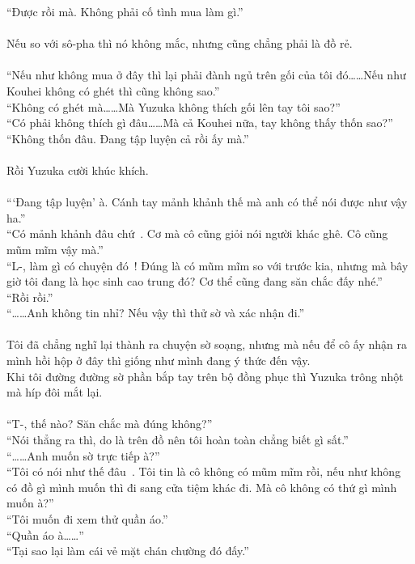 \documentclass[12pt,a4paper, twosides]{book}
\begin{document}
“Được rồi mà. Không phải cố tình mua làm gì.”\\
\\
Nếu so với sô-pha thì nó không mắc, nhưng cũng chẳng phải là đồ rẻ.\\
\\
“Nếu như không mua ở đây thì lại phải đành ngủ trên gối của tôi đó……Nếu như Kouhei không có ghét thì cũng không sao.”\\
“Không có ghét mà……Mà Yuzuka không thích gối lên tay tôi sao?”\\
“Có phải không thích gì đâu……Mà cả Kouhei nữa, tay không thấy thốn sao?”\\
“Không thốn đâu. Đang tập luyện cả rồi ấy mà.”\\
\\
Rồi Yuzuka cười khúc khích.\\
\\
“‘Đang tập luyện’ à. Cánh tay mảnh khảnh thế mà anh có thể nói được như vậy ha.”\\
“Có mảnh khảnh đâu chứ~. Cơ mà cô cũng giỏi nói người khác ghê. Cô cũng mũm mĩm vậy mà.”\\
“L-, làm gì có chuyện đó~! Đúng là có mũm mĩm so với trước kia, nhưng mà bây giờ tôi đang là học sinh cao trung đó? Cơ thể cũng đang săn chắc đấy nhé.”\\
“Rồi rồi.”\\
“……Anh không tin nhỉ? Nếu vậy thì thử sờ và xác nhận đi.”\\
\\
Tôi đã chẳng nghĩ lại thành ra chuyện sờ soạng, nhưng mà nếu để cô ấy nhận ra mình hồi hộp ở đây thì giống như mình đang ý thức đến vậy.\\
Khi tôi đường đường sờ phần bắp tay trên bộ đồng phục thì Yuzuka trông nhột mà híp đôi mắt lại.\\
\\
“T-, thế nào? Săn chắc mà đúng không?”\\
“Nói thẳng ra thì, do là trên đồ nên tôi hoàn toàn chẳng biết gì sất.”\\
“……Anh muốn sờ trực tiếp à?”\\
“Tôi có nói như thế đâu~. Tôi tin là cô không có mũm mĩm rồi, nếu như không có đồ gì mình muốn thì đi sang cửa tiệm khác đi. Mà cô không có thứ gì mình muốn à?”\\
“Tôi muốn đi xem thử quần áo.”\\
“Quần áo à……”\\
“Tại sao lại làm cái vẻ mặt chán chường đó đấy.”\\
\end{document}
